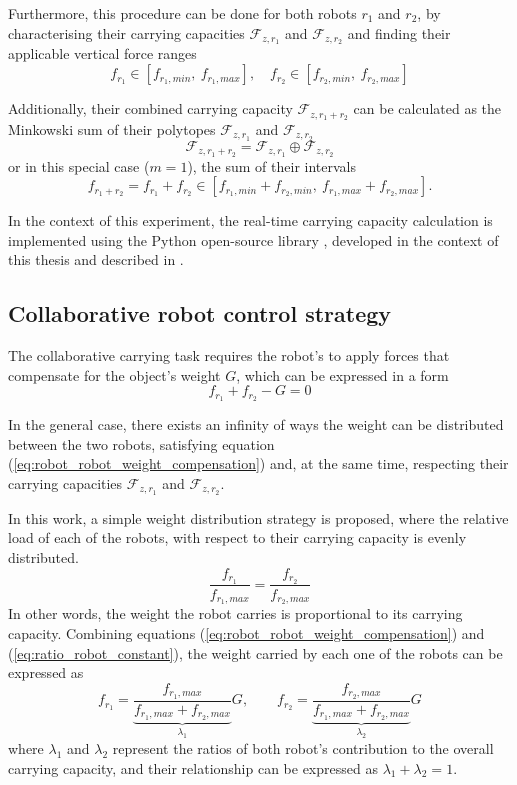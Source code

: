 Furthermore, this procedure can be done for both robots $r_1$ and $r_2$, by characterising their carrying capacities
 $\mathcal{F}_{z,r_1}$ and $\mathcal{F}_{z,r_2}$ and finding their applicable vertical force ranges 
\begin{equation}
    f_{r_1} \in [f_{r_1,min}, ~f_{r_1,max} ], \quad f_{r_2}\in [f_{r_2,min}, ~f_{r_2,max}]
    \label{eq:robot_robot_carrying_capacity}
\end{equation}
 
Additionally, their combined carrying capacity $\mathcal{F}_{z,r_1+r_2}$ can be calculated as the Minkowski sum of their polytopes $\mathcal{F}_{z,r_1}$ and $\mathcal{F}_{z,r_2}$ 
$$\mathcal{F}_{z,r_1+r_2} = \mathcal{F}_{z,r_1}\oplus \mathcal{F}_{z,r_2}$$
or in this special case ($m=1$), the sum of their intervals 
$$f_{r_1+r_2} = f_{r_1}+f_{r_2} \in  [f_{r_1,min} + f_{r_2,min}, ~f_{r_1,max} + f_{r_2,max}].$$

In the context of this experiment, the real-time carrying capacity calculation is implemented using the Python open-source library , developed in the context of this thesis and described in .

\subsection{Collaborative robot control strategy}
\label{sec:collab_robot_control_double_robot}
The collaborative carrying task requires the robot's to apply forces that compensate for the object's weight $G$, which can be expressed in a form
\begin{equation}
    f_{r_1} + f_{r_2} - G = 0
    \label{eq:robot_robot_weight_compensation}
\end{equation}

In the general case, there exists an infinity of ways the weight can be distributed between the two robots, satisfying equation (\ref{eq:robot_robot_weight_compensation}) and, at the same time, respecting their carrying capacities $\mathcal{F}_{z,r_1}$ and $\mathcal{F}_{z,r_2}$.

In this work, a simple weight distribution strategy is proposed, where the relative load of each of the robots, with respect to their carrying capacity is evenly distributed. 
\begin{equation}
\frac{f_{r_1}}{f_{r_1,max}} = \frac{f_{r_2}}{f_{r_2,max}}
\label{eq:ratio_robot_constant}
\end{equation}
In other words, the weight the robot carries is proportional to its carrying capacity. Combining equations (\ref{eq:robot_robot_weight_compensation}) and (\ref{eq:ratio_robot_constant}), the weight carried by each one of the robots can be expressed as
\begin{equation}
f_{r_1} = \underbrace{\frac{f_{r_1,max}}{f_{r_1,max} + f_{r_2,max}}}_{\lambda_1} G, \qquad f_{r_2} = \underbrace{\frac{f_{r_2,max}}{f_{r_1,max} + f_{r_2,max}}}_{\lambda_2}G 
\label{eq:robot_robot_weight_distribution}
\end{equation}
where $\lambda_1$ and $\lambda_2$ represent the ratios of both robot's contribution to the overall carrying capacity, and their relationship can be expressed as $\lambda_1 + \lambda_2 = 1$.

